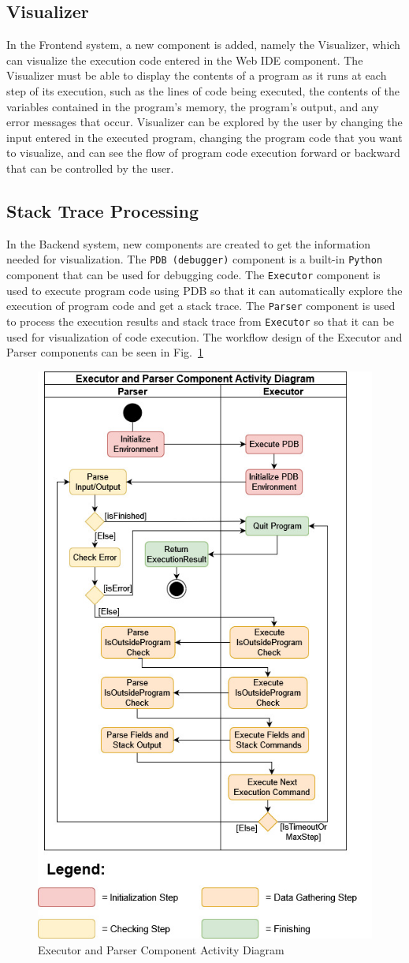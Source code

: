 \documentclass[conference]{IEEEtran}
\begin{document}
\subsection{Visualizer}
In the Frontend system, a new component is added, namely the Visualizer, which can visualize the execution code entered in the Web IDE component. The Visualizer must be able to display the contents of a program as it runs at each step of its execution, such as the lines of code being executed, the contents of the variables contained in the program's memory, the program's output, and any error messages that occur. Visualizer can be explored by the user by changing the input entered in the executed program, changing the program code that you want to visualize, and can see the flow of program code execution forward or backward that can be controlled by the user.

\subsection{Stack Trace Processing}
In the Backend system, new components are created to get the information needed for visualization. The \verb|PDB (debugger)| component is a built-in \verb|Python| component that can be used for debugging code. The \verb|Executor| component is used to execute program code using PDB so that it can automatically explore the execution of program code and get a stack trace. The \verb|Parser| component is used to process the execution results and stack trace from \verb|Executor| so that it can be used for visualization of code execution. The workflow design of the Executor and Parser components can be seen in Fig.~\ref{fig:activity-executor}

\begin{figure}[htbp]
  \centerline{\includegraphics[width=0.6\linewidth]{chapter3/activity-executor-paper.jpg}}
  \caption{Executor and Parser Component Activity Diagram} \label{fig:activity-executor}
\end{figure}
\end{document}
